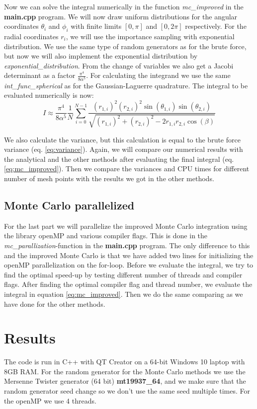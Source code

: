 \documentclass[12pt,a4paper,english]{article}
\begin{document}
Now we can solve the integral numerically in the function \textit{mc\_improved} in the \textbf{main.cpp} program. We will now draw uniform distributions for the angular coordinates $\theta_i$ and $\phi_i$ with finite limits $[0,\pi]$ and $[0, 2\pi]$ respectively. For the radial coordinates $r_i$, we will use the importance sampling with exponential distribution. We use the same type of random generators as for the brute force, but now we will also implement the exponential distribution by \textit{exponential\_distribution}. From the change of variables we also get a Jacobi determinant as a factor $\frac{\pi^4}{8\alpha^5}$. For calculating the integrand we use the same \textit{int\_func\_spherical} as for the Gaussian-Laguerre quadrature. The integral to be evaluated numerically is now:
\begin{equation}
\label{eq:mc_improved}
I\approx\frac{\pi^4}{8\alpha^5}\frac{1}{N}\sum_{i=0}^{N-1}\frac{(r_{1,i})^2(r_{2,i})^2\sin(\theta_{1,i})\sin(\theta_{2,i})}{\sqrt{(r_{1,i})^2+(r_{2,i})^2-2r_{1,i}r_{2,i}\cos(\beta)}}
\end{equation}

We also calculate the variance, but this calculation is equal to the brute force variance (eq. \ref{eq:variance}). Again, we will compare our numerical results with the analytical and the other methods after evaluating the final integral (eq. \ref{eq:mc_improved}). Then we compare the variances and CPU times for different number of mesh points with the results we got in the other methods.

\subsection{Monte Carlo parallelized}
For the last part we will parallelize the improved Monte Carlo integration using the library openMP and various compiler flags. This is done in the \textit{mc\_parallization}-function in the \textbf{main.cpp} program. The only difference to this and the improved Monte Carlo is that we have added two lines for initializing the openMP parallelization on the for-loop. Before we evaluate the integral, we try to find the optimal speed-up by testing different number of threads and compiler flags. After finding the optimal compiler flag and thread number, we evaluate the integral in equation \ref{eq:mc_improved}. Then we do the same comparing as we have done for the other methods.

\section{Results}
The code is run in C++ with QT Creator on a 64-bit Windows 10 laptop with 8GB RAM. For the random generator for the Monte Carlo methods we use the Mersenne Twister generator (64 bit) \textbf{mt19937\_64}, and we make sure that the random generator seed change so we don't use the same seed multiple times. For the openMP we use 4 threads.
\end{document}
